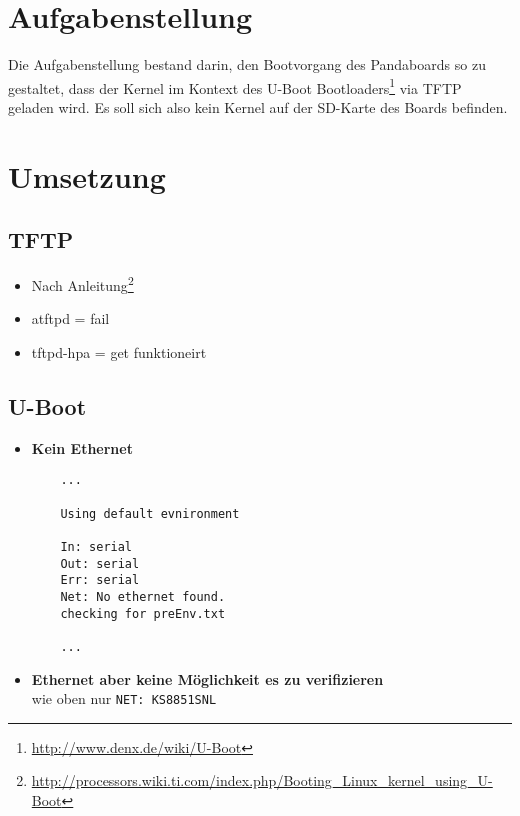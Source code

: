 \documentclass[11pt,twoside,a4paper]{article}
\begin{document}


\clearpage
\setcounter{page}{1}
\tableofcontents

\section{Aufgabenstellung}
\setcounter{page}{1}
Die Aufgabenstellung bestand darin, den Bootvorgang des Pandaboards so zu gestaltet, dass der Kernel im Kontext des U-Boot Bootloaders\footnote{\url{http://www.denx.de/wiki/U-Boot}} via TFTP geladen wird. Es soll sich also kein Kernel auf der SD-Karte des Boards befinden.

\section{Umsetzung}
\subsection{TFTP}
\begin{itemize}
	\item Nach Anleitung\footnote{\url{http://processors.wiki.ti.com/index.php/Booting\_Linux\_kernel\_using\_U-Boot}}
	\item atftpd = fail
	\item tftpd-hpa = get funktioneirt
\end{itemize}
\subsection{U-Boot}
\begin{itemize}
	\item \textbf{Kein Ethernet}\\
	\begin{verbatim}
	...

	Using default evnironment
	
	In: serial
	Out: serial
	Err: serial
	Net: No ethernet found.
	checking for preEnv.txt

	...
	\end{verbatim}
	\item \textbf{Ethernet aber keine Möglichkeit es zu verifizieren}\\ 
	wie oben nur \texttt{NET: KS8851SNL}
\end{itemize}
\end{document}
